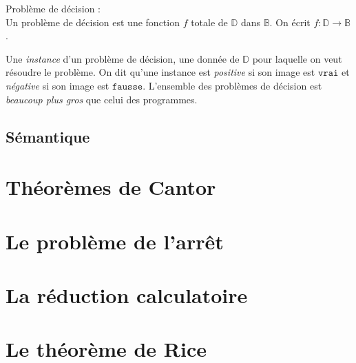     \begin{definition}\label{def:pb-decision}
        Problème de décision :\\
        Un problème de décision est une fonction \(f\) totale de \(\mathbb{D}\) dans \(\mathbb{B}\). On écrit \(f\colon\mathbb{D}\rightarrow\mathbb{B}\).
    \end{definition}

    Une \emph{instance} d'un problème de décision, une donnée de \(\mathbb{D}\) pour laquelle on veut résoudre le problème. On dit qu'une instance est \emph{positive} si son image est \(\mathtt{vrai}\) et \emph{négative} si son image est \(\mathtt{fausse}\). L'ensemble des problèmes de décision est \emph{beaucoup plus gros} que celui des programmes.

    \subsection{S\'emantique}
  \section{Th\'eor\`emes de Cantor}\label{sec:theoremes_cantor}
  
  
  \section{Le probl\`eme de l'arrêt}\label{sec:probleme_arret}
  
  
  \section{La r\'eduction calculatoire}\label{sec:reduction_calculatoire}
  
  
  \section{Le th\'eor\`eme de Rice}\label{sec:theoreme_rice}